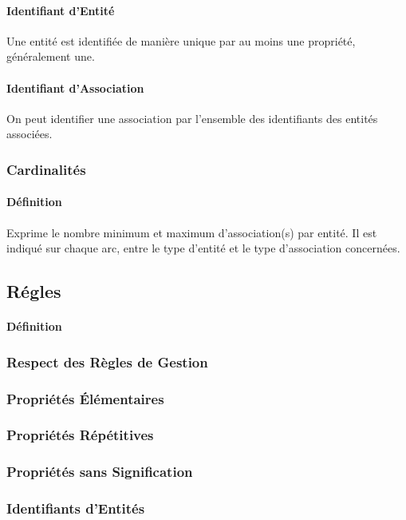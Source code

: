 \documentclass{article}
\begin{document}
\paragraph{Identifiant d'Entité}Une entité est identifiée de manière unique par au moins une propriété, généralement une.

\paragraph{Identifiant d'Association}On peut identifier une association par l'ensemble des identifiants des entités associées.

\subsubsection{Cardinalités}
\paragraph{Définition}Exprime le nombre minimum et maximum d'association(s) par entité. Il est indiqué sur chaque arc, entre le type d'entité et le type d'association concernées.

\subsection{Régles}
\paragraph{Définition}

\subsubsection{Respect des Règles de Gestion}
\subsubsection{Propriétés Élémentaires}
\subsubsection{Propriétés Répétitives}
\subsubsection{Propriétés sans Signification}
\subsubsection{Identifiants d'Entités}
\end{document}
